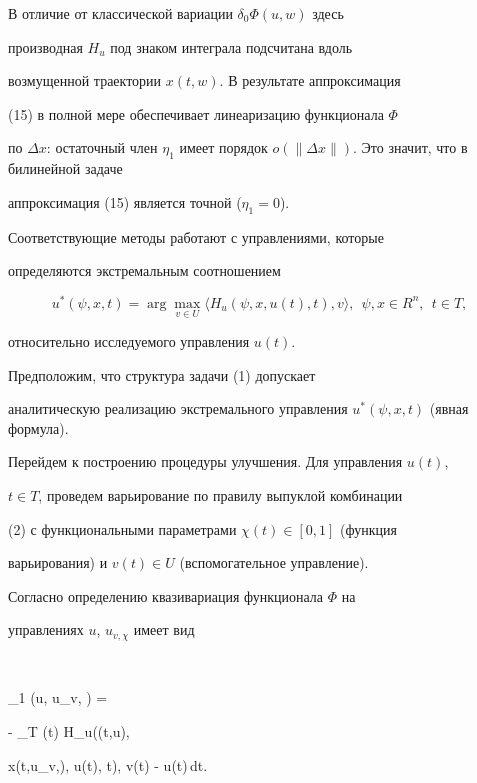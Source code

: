 В отличие от классической вариации $\delta_{0} \Phi(u, w)$ здесь


производная $H_{u}$ под знаком интеграла подсчитана вдоль


возмущенной траектории $x(t, w)$. В результате аппроксимация


(15) в полной мере обеспечивает линеаризацию функционала $\Phi$


по $\Delta x$: остаточный член $\eta_{1}$ имеет порядок $o(\|


\Delta x \|)$. Это значит, что в билинейной задаче 


аппроксимация (15) является точной ($ \eta_{1} = 0$).





Соответствующие методы работают с управлениями, которые


определяются экстремальным соотношением


$$


u^{*}(\psi, x, t) = \arg\max_{v \in U} 


\langle H_{u}(\psi, x, u(t), t), v\rangle,\ \ \psi, x \in R^{n},\ \ t\in T, 


$$


относительно исследуемого управления $u(t)$.





Предположим, что структура задачи (1) допускает


аналитическую реализацию экстремального управления $u^{*}(\psi, x,


t)$ (явная формула).





Перейдем к построению процедуры улучшения. Для управления $u(t)$,


$t \in T$, проведем варьирование по правилу выпуклой комбинации


(2) с функциональными параметрами $\chi(t) \in [0,1]$ (функция


варьирования) и $v(t) \in U$ (вспомогательное управление).


Согласно определению квазивариация функционала $\Phi$ на


управлениях $u$, $u_{v, \chi}$ имеет вид


$$


\delta_{1} \Phi(u, u_{v, \chi}) =


- \int_{T} \chi(t) \langle H_{u}(\psi(t,u),


x(t,u_{v,\chi}), u(t), t), v(t) - u(t)\rangle \,dt.


